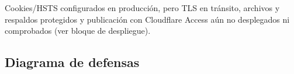 Cookies/HSTS configurados en producción, pero TLS en tránsito, archivos y
respaldos protegidos y publicación con Cloudflare Access aún no desplegados
ni comprobados (ver bloque de despliegue).

\clearpage
\subsection{Diagrama de defensas}


\clearpage
